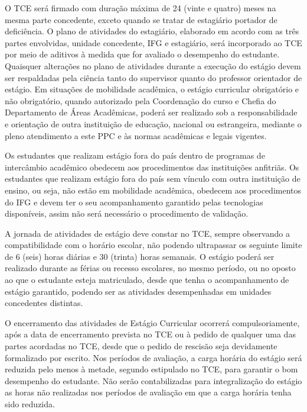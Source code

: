 \documentclass[11pt,fleqn]{book} %
\begin{document}
O TCE será firmado com duração máxima de 24 (vinte e quatro) meses na mesma parte concedente, exceto quando se tratar de estagiário portador de deficiência. 
O plano de atividades do estagiário, elaborado em acordo com as três partes envolvidas, unidade concedente, IFG e estagiário, será incorporado ao TCE por meio de aditivos à medida que for avaliado o desempenho do estudante. 
Quaisquer alterações no plano de atividades durante a execução do estágio devem ser respaldadas pela ciência tanto do supervisor quanto do professor orientador de estágio.
Em situações de mobilidade acadêmica, o estágio curricular obrigatório e não obrigatório, quando autorizado pela Coordenação do curso e Chefia do Departamento de Áreas Acadêmicas, poderá ser realizado sob a responsabilidade e orientação de outra instituição de educação, nacional ou estrangeira, mediante o pleno atendimento a este PPC e às normas acadêmicas e legais vigentes.

Os estudantes que realizam estágio fora do país dentro de programas de intercâmbio acadêmico obedecem aos procedimentos das instituições anfitriãs. 
Os estudantes que realizam estágio fora do país sem vínculo com outra instituição de ensino, ou seja, não estão em mobilidade acadêmica, obedecem aos procedimentos do IFG e devem ter o seu acompanhamento garantido pelas tecnologias disponíveis, assim não será necessário o procedimento de validação.

A jornada de atividades de estágio deve constar no TCE, sempre observando a compatibilidade com o horário escolar, não podendo ultrapassar os seguinte limite de 6 (seis) horas diárias e 30 (trinta) horas semanais. 
O estágio poderá ser realizado durante as férias ou recesso escolares, no mesmo período, ou no oposto ao que o estudante esteja matriculado, desde que tenha o acompanhamento de estágio garantido, podendo ser as atividades desempenhadas em unidades concedentes distintas.

O encerramento das atividades de Estágio Curricular ocorrerá compulsoriamente, após a data de encerramento prevista no TCE ou à pedido de qualquer uma das partes acordadas no TCE, desde que o pedido de rescisão seja devidamente formalizado por escrito.
Nos períodos de avaliação, a carga horária do estágio será reduzida pelo menos à metade, segundo estipulado no TCE, para garantir o bom desempenho do estudante. 
Não serão contabilizadas para integralização do estágio as horas não realizadas nos períodos de avaliação em que a carga horária tenha sido reduzida.
  
\end{document}
